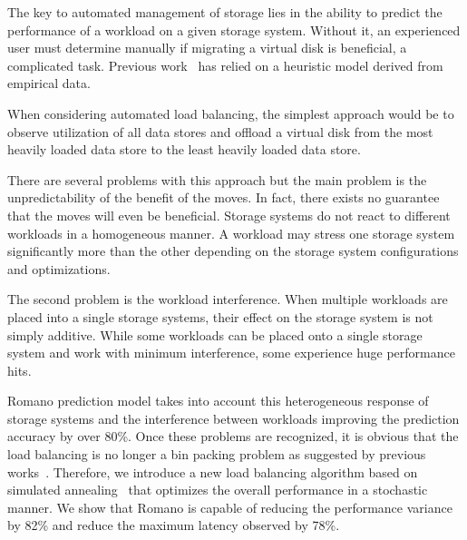 The key to automated management of storage lies in the ability to predict the performance of a workload on a given storage system.
Without it, an experienced user must determine manually if migrating a virtual disk is beneficial, a complicated task. 
Previous work~\cite{gulati:2010, gulati:2011} has relied on a heuristic model derived from empirical data.

When considering automated load balancing, the simplest approach would be to observe utilization of all data stores and offload a virtual disk from the most heavily loaded data store to the least heavily loaded data store.

There are several problems with this approach but the main problem is the unpredictability of the benefit of the moves. 
In fact, there exists no guarantee that the moves will even be beneficial. Storage systems do not react to different workloads in a homogeneous manner. 
A workload may stress one storage system significantly more than the other depending on the storage system configurations and optimizations.

The second problem is the workload interference.
When multiple workloads are placed into a single storage systems, their effect on the storage system is not simply additive. While some workloads can be placed onto a single storage system and work with minimum interference, some experience huge performance hits.

Romano prediction model takes into account this heterogeneous response of storage systems and the interference between workloads improving the prediction accuracy by over 80\%. Once these problems are recognized, it is obvious that the load balancing is no longer a bin packing problem as suggested by previous works~\cite{gulati:2010, gulati:2011, singh:2008}.
Therefore, we introduce a new load balancing algorithm based on simulated annealing~\cite{kirkpatrick:1983} that optimizes the overall performance in a stochastic manner.
We show that Romano is capable of reducing the performance variance by 82\% and reduce the maximum latency observed by 78\%.

